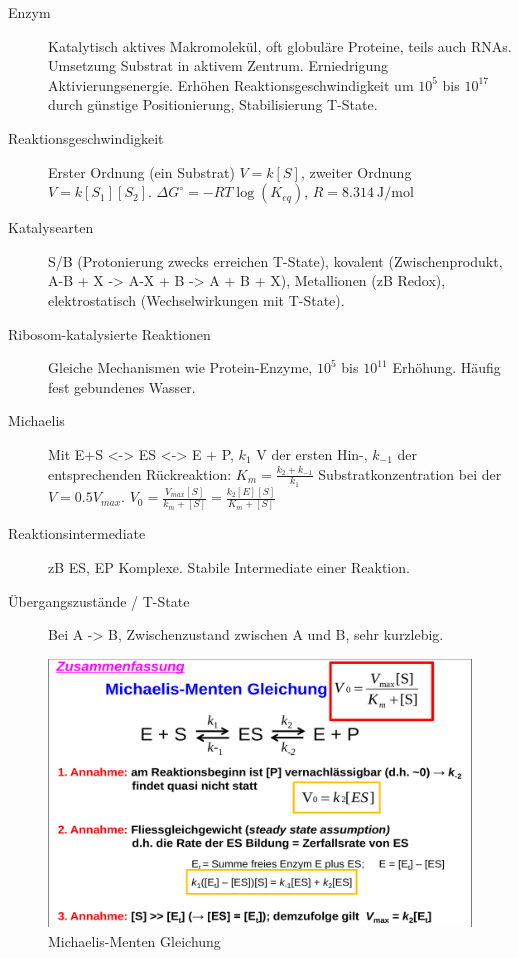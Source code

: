 \documentclass[a4paper,twocolumn,english,fontsize=7,DIV=16]{scrartcl}
\begin{document}
\begin{description}
	\item[Enzym] Katalytisch aktives Makromolekül, oft globuläre Proteine,
		teils auch RNAs. Umsetzung Substrat in aktivem Zentrum.
		Erniedrigung Aktivierungsenergie. Erhöhen
		Reaktionsgeschwindigkeit um $10^5$ bis $10^17$ durch günstige
		Positionierung, Stabilisierung T-State.
	\item[Reaktionsgeschwindigkeit] Erster Ordnung (ein Substrat) $V =
		k[S]$, zweiter Ordnung $V = k [S_1][S_2]$. $\Delta G^\circ = -R
		T \log(K_{eq})$, $R = \SI{8.314}{\J \per \mol}$
	\item[Katalysearten] S/B (Protonierung zwecks erreichen T-State),
		kovalent (Zwischenprodukt, A-B + X -> A-X + B -> A + B + X),
		Metallionen (zB Redox), elektrostatisch (Wechselwirkungen mit
		T-State).
	\item[Ribosom-katalysierte Reaktionen] Gleiche Mechanismen wie
		Protein-Enzyme, $10^5$ bis $10^11$ Erhöhung. Häufig fest
		gebundenes Wasser.
	\item[Michaelis] Mit E+S <-> ES <-> E + P, $k_1$ V der ersten Hin-,
		$k_{-1}$ der entsprechenden Rückreaktion: $K_m = \frac{k_2 +
		k_{-1}}{k_1}$ Substratkonzentration bei der $V = 0.5 V_{max}$.
		$V_0 = \frac{V_{max} [S]}{k_m + [S]} = \frac{k_2[E][S]}{K_m +
		[S]}$
	\item[Reaktionsintermediate] zB ES, EP Komplexe. Stabile Intermediate
		einer Reaktion.
	\item[Übergangszustände / T-State] Bei A -> B, Zwischenzustand zwischen
		A und B, sehr kurzlebig.
\end{description}

\begin{figure}
	\centering
	\includegraphics[width=\linewidth]{img/michaelis.png}
	\caption{Michaelis-Menten Gleichung}
\end{figure}
\end{document}
